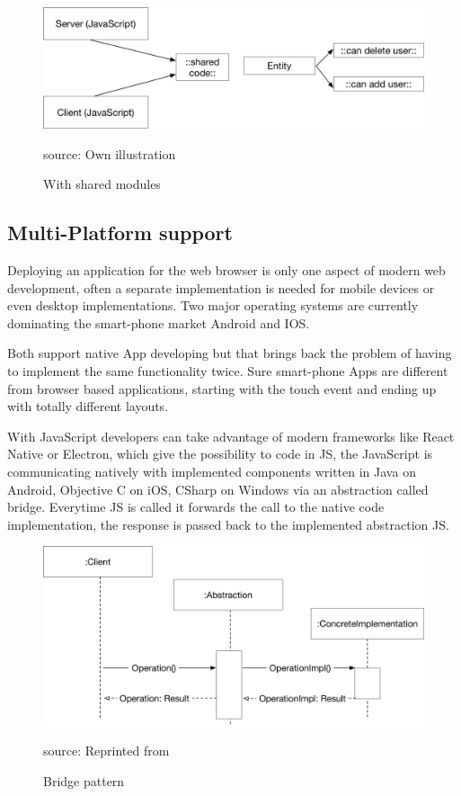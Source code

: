 \begin{figure}[H]
	\centering
	\includegraphics[width=0.8\linewidth]{bilder/grundlagen/Entity2.png}
	\caption{With shared modules} source: Own illustration
	\label{fig:DS2}
\end{figure}


\subsection{Multi-Platform support}

Deploying an application for the web browser is only one aspect of modern web development, often a separate implementation is needed for mobile devices or even desktop implementations. Two major operating systems are currently dominating the smart-phone market Android and IOS. 

Both support native App developing but that brings back the problem of having to implement the same functionality twice. Sure smart-phone Apps are different from browser based applications, starting with the touch event and ending up with totally different layouts. 

With JavaScript developers can take advantage of modern frameworks like React Native or Electron, which give the possibility to code in \gls{JS}, the JavaScript is communicating natively with implemented components written in Java on Android, Objective C on iOS, CSharp on Windows via an abstraction called bridge. Everytime \gls{JS} is called it forwards the call to the native code implementation, the response is passed back to the implemented abstraction \gls{JS}. \cite{Purewal2014LearningWeb}

\begin{figure}[H]
	\centering
	\includegraphics[width=0.8\linewidth]{bilder/grundlagen/BridgePattern.png}
	\caption{Bridge pattern} source: Reprinted from \cite{GOLL}
	\label{fig:BP}
\end{figure}


